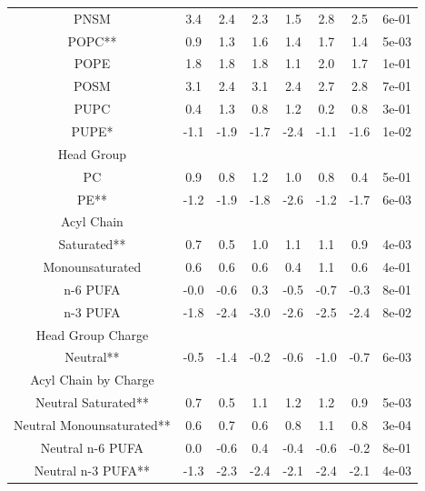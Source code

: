 \documentclass[9pt]{article}
\begin{document}
\begin{table}
{\begin{tabular}{| c || ccccc |cc|}
PNSM    &            3.4 &         2.4 &          2.3 &            1.5 &          2.8 &  2.5 &  6e-01 \\
POPC**    &            0.9 &         1.3 &          1.6 &            1.4 &          1.7 &  1.4 &  5e-03 \\
POPE    &            1.8 &         1.8 &          1.8 &            1.1 &          2.0 &  1.7 &  1e-01 \\
POSM    &            3.1 &         2.4 &          3.1 &            2.4 &          2.7 &  2.8 &  7e-01 \\
PUPC    &            0.4 &         1.3 &          0.8 &            1.2 &          0.2 &  0.8 &  3e-01 \\
PUPE*    &           -1.1 &        -1.9 &         -1.7 &           -2.4 &         -1.1 & -1.6 &  1e-02 \\
        \hline
Head Group &&&&&&&\\
PC      &            0.9 &         0.8 &          1.2 &            1.0 &        0.8 &  0.4  &  5e-01 \\
PE**      &           -1.2 &        -1.9 &         -1.8 &           -2.6 &         -1.2 & -1.7 &  6e-03 \\
        \hline
Acyl Chain &&&&&&&\\
Saturated**      &            0.7 &         0.5 &          1.0 &            1.1 &          1.1 &  0.9 &  4e-03 \\
Monounsaturated      &            0.6 &         0.6 &          0.6 &            0.4 &          1.1 &  0.6 &  4e-01 \\
n-6 PUFA      &           -0.0 &        -0.6 &          0.3 &           -0.5 &         -0.7 & -0.3 &  8e-01 \\
n-3 PUFA      &           -1.8 &        -2.4 &         -3.0 &           -2.6 &         -2.5 & -2.4 &  8e-02 \\
        \hline
Head Group Charge &&&&&&&\\
Neutral** &           -0.5 &        -1.4 &         -0.2 &           -0.6 &         -1.0 & -0.7 &  6e-03 \\
        \hline
Acyl Chain by Charge &&&&&&&\\
Neutral Saturated**    &            0.7 &         0.5 &          1.1 &            1.2 &          1.2 &  0.9 &  5e-03 \\
Neutral Monounsaturated**    &            0.6 &         0.7 &          0.6 &            0.8 &          1.1 &  0.8 &  3e-04 \\
Neutral n-6 PUFA    &            0.0 &        -0.6 &          0.4 &           -0.4 &         -0.6 & -0.2 &  8e-01 \\
Neutral n-3 PUFA**    &           -1.3 &        -2.3 &         -2.4 &           -2.1 &         -2.4 & -2.1 &  4e-03 \\
\hline
\end{tabular}}
\end{table}
\end{document}
